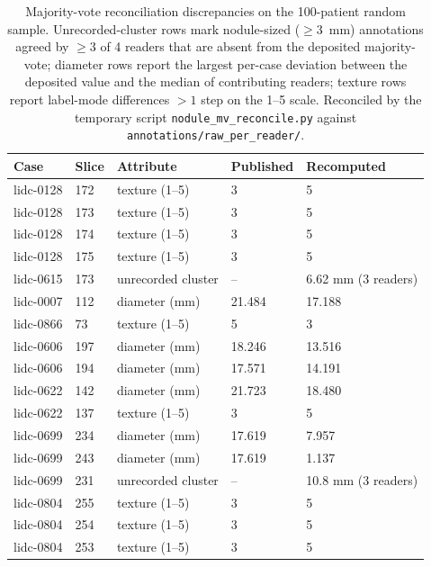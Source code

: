 \documentclass[twoside,11pt]{article}
\begin{document}
\begin{table}[ht]
    \centering
    \small
    \setlength{\tabcolsep}{4pt}
    \begin{tabular}{lllll}
        \toprule
        Case & Slice & Attribute & Published & Recomputed \\
        \midrule
        lidc-0128 & 172 & texture (1--5) & 3 & 5 \\
        lidc-0128 & 173 & texture (1--5) & 3 & 5 \\
        lidc-0128 & 174 & texture (1--5) & 3 & 5 \\
        lidc-0128 & 175 & texture (1--5) & 3 & 5 \\
        lidc-0615 & 173 & unrecorded cluster & -- & 6.62 mm (3 readers) \\
        lidc-0007 & 112 & diameter (mm) & 21.484 & 17.188 \\
        lidc-0866 & 73 & texture (1--5) & 5 & 3 \\
        lidc-0606 & 197 & diameter (mm) & 18.246 & 13.516 \\
        lidc-0606 & 194 & diameter (mm) & 17.571 & 14.191 \\
        lidc-0622 & 142 & diameter (mm) & 21.723 & 18.480 \\
        lidc-0622 & 137 & texture (1--5) & 3 & 5 \\
        lidc-0699 & 234 & diameter (mm) & 17.619 & 7.957 \\
        lidc-0699 & 243 & diameter (mm) & 17.619 & 1.137 \\
        lidc-0699 & 231 & unrecorded cluster & -- & 10.8 mm (3 readers) \\
        lidc-0804 & 255 & texture (1--5) & 3 & 5 \\
        lidc-0804 & 254 & texture (1--5) & 3 & 5 \\
        lidc-0804 & 253 & texture (1--5) & 3 & 5 \\
        \bottomrule
    \end{tabular}
    \caption{Majority-vote reconciliation discrepancies on the 100-patient random sample. Unrecorded-cluster rows mark nodule-sized ($\geq 3$~mm) annotations agreed by $\geq 3$ of 4 readers that are absent from the deposited majority-vote; diameter rows report the largest per-case deviation between the deposited value and the median of contributing readers; texture rows report label-mode differences $> 1$ step on the 1--5 scale. Reconciled by the temporary script \texttt{nodule\_mv\_reconcile.py} against \texttt{annotations/raw\_per\_reader/}.}
    \label{tab:mv_reconciliation_supp}
\end{table}
\end{document}
